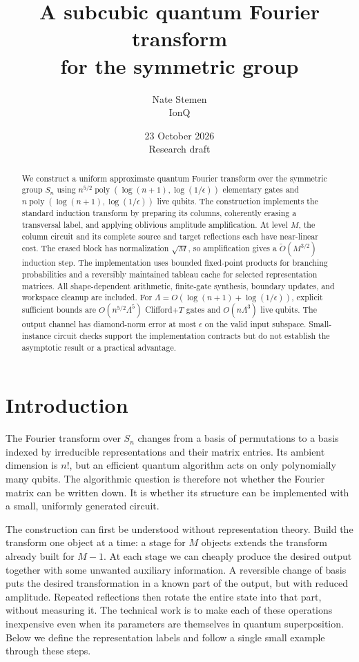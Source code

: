 \documentclass[11pt]{article}
\title{\color{Ink}\LARGE\bfseries A subcubic quantum Fourier transform\\[3pt]
for the symmetric group}
\author{Nate Stemen\\[3pt]\small IonQ}
\date{\small 23 October 2026\\[2pt]\footnotesize Research draft}
\theoremstyle{definition}
\newcommand{\poly}{\operatorname{poly}}
\begin{document}
\maketitle

\begin{abstract}
We construct a uniform approximate quantum Fourier transform over the
symmetric group $S_n$ using
$n^{5/2}\poly(\log(n+1),\log(1/\epsilon))$ elementary gates and
$n\poly(\log(n+1),\log(1/\epsilon))$ live qubits.
The construction implements the standard induction transform by preparing
its columns, coherently erasing a transversal label, and applying oblivious
amplitude amplification. At level $M$, the column circuit and its complete
source and target reflections each have near-linear cost. The erased
block has normalization $\sqrt M$, so amplification gives a
$\widetilde O(M^{3/2})$ induction step.
The implementation uses bounded fixed-point products for branching
probabilities and a reversibly maintained tableau cache for selected
representation matrices. All shape-dependent arithmetic, finite-gate
synthesis, boundary updates, and workspace cleanup are included.
For $\Lambda=O(\log(n+1)+\log(1/\epsilon))$, explicit sufficient bounds are
$O(n^{5/2}\Lambda^5)$ Clifford+$T$ gates and $O(n\Lambda^3)$ live qubits.
The output channel has diamond-norm error at most $\epsilon$ on the valid
input subspace. Small-instance circuit checks support the implementation
contracts but do not establish the asymptotic result or a practical advantage.
\end{abstract}

\section{Introduction}\label{sec:introduction}

The Fourier transform over $S_n$ changes from a basis of permutations to
a basis indexed by irreducible representations and their matrix entries.
Its ambient dimension is $n!$, but an efficient quantum algorithm acts
on only polynomially many qubits. The algorithmic question is therefore
not whether the Fourier matrix can be written down. It is whether its
structure can be implemented with a small, uniformly generated circuit.

The construction can first be understood without representation theory.
Build the transform one object at a time: a stage for $M$ objects extends
the transform already built for $M-1$. At each stage we can cheaply produce
the desired output together with some unwanted auxiliary information.
A reversible change of basis puts the desired transformation in a known
part of the output, but with reduced amplitude. Repeated reflections
then rotate the entire state into that part, without measuring it.
The technical work is to make each of these operations inexpensive even
when its parameters are themselves in quantum superposition.
Below we define the representation labels and follow a single small
example through these steps.
\end{document}
